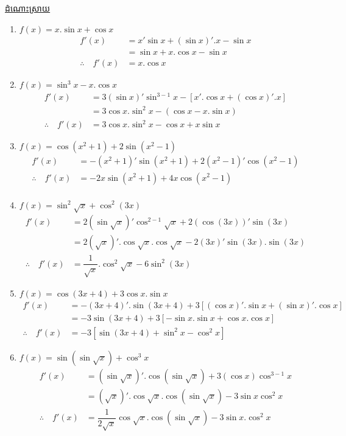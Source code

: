 \documentclass[12pt,fleqn]{book} %
\newcommand{\answer}{\begin{center}
\kml \color{blue} \underline{ដំណោះស្រាយ}
\end{center}}
\begin{document}
\answer 
\begin{enumerate}
\item $f(x)=x.\sin x+\cos x$
\begin{align*}
f'(x)&=x'\sin x+(\sin x)'. x-\sin x\\
&=\sin x+x.\cos x-\sin x\\
\therefore \quad f'(x)&=x.\cos x
\end{align*}
\item $f(x)=\sin^3 x-x.\cos x$
\begin{align*}
f'(x)&=3(\sin x)'\sin^{3-1}x-[x'.\cos x+(\cos x)'.x]\\
&=3\cos x. \sin^2 x-(\cos x-x.\sin x)\\
\therefore \quad f'(x)&=3\cos x.\sin^2 x-\cos x +x\sin x
\end{align*}
\item $f(x)=\cos (x^2+1)+2\sin (x^2-1)$
\begin{align*}
f'(x)&=-(x^2+1)'\sin (x^2+1)+2(x^2-1)'\cos (x^2-1)\\
\therefore \quad f'(x)&=-2x\sin (x^2+1)+4x\cos (x^2-1)\\
\end{align*}
\item $f(x)=\sin^2\sqrt{x}+\cos^2 (3x)$
\begin{align*}
f'(x)&=2(\sin \sqrt{x})'\cos^{2-1} \sqrt{x}+2(\cos (3x))' \sin (3x)\\
&=2(\sqrt{x})'.\cos \sqrt{x}.\cos \sqrt{x}-2(3x)'\sin (3x).\sin (3x)\\
\therefore \quad f'(x)&=\dfrac{1}{\sqrt{x}}.\cos^2 \sqrt{x}-6\sin^2 (3x)
\end{align*}
\item $f(x)=\cos (3x+4)+3\cos x.\sin x$
\begin{align*}
f'(x)&=-(3x+4)'.\sin (3x+4)+3[(\cos x)'.\sin x+(\sin x)'.\cos x]\\
&=-3\sin (3x+4)+3[-\sin x.\sin x+\cos x.\cos x]\\
\therefore \quad f'(x)&=-3[\sin (3x+4)+\sin^2x -\cos^2 x]
\end{align*}
\item $f(x)=\sin (\sin \sqrt{x})+\cos^3 x$
\begin{align*}
f'(x)&=(\sin \sqrt{x})'.\cos (\sin \sqrt{x})+3(\cos x)\cos^{3-1}x\\
&=(\sqrt{x})'.\cos \sqrt{x}.\cos(\sin \sqrt{x})-3\sin x\cos ^2 x\\
\therefore \quad f'(x)&=\dfrac{1}{2\sqrt{x}}\cos \sqrt{x}.\cos (\sin \sqrt{x})-3\sin x.\cos^2 x
\end{align*}
\end{enumerate}
\end{document}

